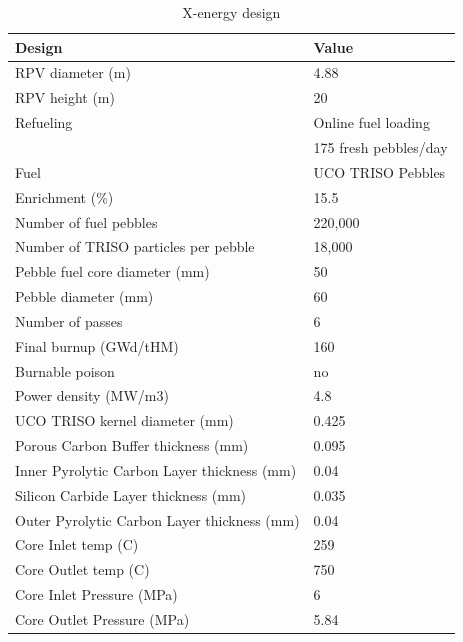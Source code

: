 \documentclass[10pt,a4paper]{article}
\begin{document}
\begin{table} [ht]
\begin{center}

\caption{ X-energy design}
\label{xtable}
\begin{tabular}{l l}
\hline 
Design 		&Value \\ 
\hline 
RPV diameter (m) 		&4.88 \\ 
RPV height (m) 		&20 \\ 
Refueling		&Online fuel loading  \\ 
	&175 fresh pebbles/day \\ 
Fuel		&UCO TRISO Pebbles \\ 
Enrichment (\%)		&15.5 \\ 
Number of fuel pebbles		&220,000 \\ 
Number of TRISO particles per pebble		&18,000 \\ 
Pebble fuel core diameter (mm)		&50 \\ 
Pebble diameter (mm)	&60 \\ 
Number of passes		&6\\ 
Final burnup (GWd/tHM)		&160 \\ 
Burnable poison		&no \\ 
Power density (MW/m3)		&4.8 \\ 
UCO TRISO kernel diameter (mm)	&0.425 \\ 
Porous Carbon Buffer thickness (mm)	&0.095 \\ 
Inner Pyrolytic Carbon Layer thickness (mm) 	&0.04 \\ 
Silicon Carbide Layer thickness (mm)	&0.035 \\ 
Outer Pyrolytic Carbon Layer thickness (mm)	&0.04 \\ 
Core Inlet temp (C)	&259 \\ 
Core Outlet temp (C) 	&750 \\ 
Core Inlet Pressure (MPa)	&6 \\ 
Core Outlet Pressure (MPa)	&5.84 \\ 
\hline 

\end{tabular}
\end{center}
\end{table}
\end{document}
